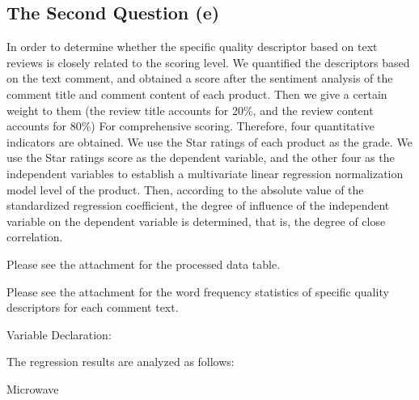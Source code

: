 \documentclass[12pt]{article}
\begin{document}
\subsection{The Second Question (e)}
\par
In order to determine whether the specific quality descriptor based on text reviews is closely related to the scoring level. We quantified the descriptors based on the text comment, and obtained a score after the sentiment analysis of the comment title and comment content of each product. Then we give a certain weight to them (the review title accounts for 20\%, and the review content accounts for 80\%) For comprehensive scoring. Therefore, four quantitative indicators are obtained. We use the Star ratings of each product as the grade. We use the Star ratings score as the dependent variable, and the other four as the independent variables to establish a multivariate linear regression normalization model level of the product. Then, according to the absolute value of the standardized regression coefficient, the degree of influence of the independent variable on the dependent variable is determined, that is, the degree of close correlation.
\par
Please see the attachment for the processed data table.
\par
Please see the attachment for the word frequency statistics of specific quality descriptors for each comment text.
\par
Variable Declaration:
\par
\quad\par\quad\par\quad\par\quad\par\quad\par\quad\par\quad\par\quad\par
The regression results are analyzed as follows:
\par
Microwave
\par\quad\par\quad\par\quad\par\quad\par\quad\par\quad\par\quad\par\quad\par\quad\par\quad\par\quad\par
\end{document}
